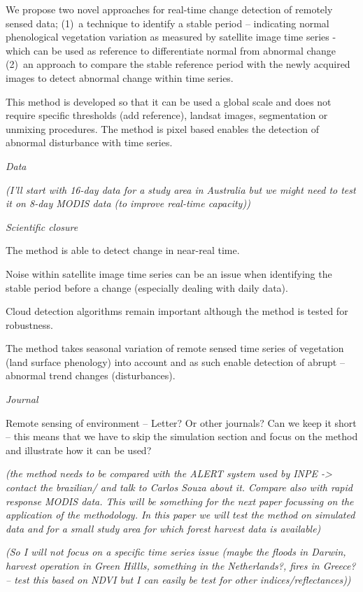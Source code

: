 \documentclass[authoryear,preprint,review,10pt]{elsarticle}
\newcommand{\readme}[1]{\emph{\marginpar{README} (#1)}}
\begin{document}
We propose two novel approaches for real-time change detection of remotely
sensed data; (1)~a technique to identify a stable period -- indicating normal
phenological vegetation variation as measured by satellite image time series -
which can be used as reference to differentiate normal from abnormal change
(2)~an approach to compare the stable reference period with the newly acquired images
to detect abnormal change within time series.

This method is developed so that it can be used a global scale and does not
require specific thresholds (add reference), landsat images, segmentation or
unmixing procedures. The method is pixel based enables the detection of abnormal
disturbance with time series.

\emph{Data}

\readme{I'll start with 16-day data for a study area in Australia but we might need to
test it on 8-day MODIS data (to improve real-time capacity)}

\emph{Scientific closure}

The method is able to detect change in near-real time. 

Noise within satellite image time series can be an issue when identifying the stable period before a
change (especially dealing with daily data). 

Cloud detection algorithms remain important although the method is tested for robustness.

The method takes seasonal variation of remote sensed time series of vegetation (land surface
phenology) into account and as such enable detection of abrupt -- abnormal trend
changes (disturbances).

\emph{Journal}

Remote sensing of environment -- Letter? Or other journals? Can we keep it short -- this means that
we have to skip the simulation section and focus on the method and illustrate
how it can be used? 

\readme{the method needs to be compared with the ALERT system used by INPE -> contact
the brazilian/ and talk to Carlos Souza about it. Compare also with rapid
response MODIS data. This will be something for the next paper focussing on the application of the methodology. 
In this paper we will test the method on simulated data and for a small study area for which forest harvest data is available}

\readme{So I will not focus on a specific time series issue (maybe the floods in Darwin,
harvest operation in Green Hillls, something in the Netherlands?, fires in
Greece? -- test this based on NDVI but I can easily be test for other
indices/reflectances)}
\end{document}
